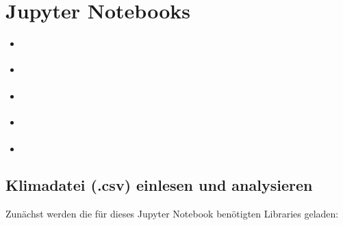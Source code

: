 \documentclass[letterpaper,10pt,english]{jupyterBook}
\begin{document}
\sphinxstepscope


\chapter{Jupyter Notebooks}
\label{\detokenize{content/T_Tutorials:jupyter-notebooks}}\label{\detokenize{content/T_Tutorials::doc}}\begin{itemize}
\item {} 
\sphinxAtStartPar
{\hyperref[\detokenize{content/T_Plotten::doc}]{}}

\item {} 
\sphinxAtStartPar
{\hyperref[\detokenize{content/T_Fehlerfortpflanzung::doc}]{}}

\item {} 
\sphinxAtStartPar
{\hyperref[\detokenize{content/T_LinReg::doc}]{}}

\item {} 
\sphinxAtStartPar
{\hyperref[\detokenize{content/T_FitmitFehlerbalken::doc}]{}}

\item {} 
\sphinxAtStartPar
{\hyperref[\detokenize{content/T_Spektralanalyse_Audio::doc}]{}}

\end{itemize}

\sphinxstepscope


\section{Klimadatei (.csv) einlesen und analysieren}
\label{\detokenize{content/T_Plotten:klimadatei-csv-einlesen-und-analysieren}}\label{\detokenize{content/T_Plotten::doc}}
\sphinxAtStartPar
Zunächst werden die für dieses Jupyter Notebook benötigten Libraries geladen:
\end{document}
